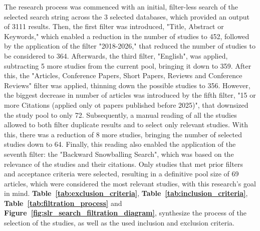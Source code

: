 \documentclass[12pt,reqno, twoside]{amsbook}
\theoremstyle{plain}
\numberwithin{equation}{chapter}
\newcommand{\tabref}[1]{\textbf{Table~\ref{#1}}}
\newcommand{\figref}[1]{\textbf{Figure~\ref{#1}}}
\numberwithin{section}{chapter}
\begin{document}
\noindent The research process was commenced with an initial, filter-less search of the selected search string across the 3 selected databases, which provided an output of 3111 results. Then, the first filter was introduced, "Title, Abstract or Keywords," which enabled a reduction in the number of studies to 452, followed by the 
application of the filter "2018-2026," that reduced the number of studies to be considered to 364. Afterwards, the third filter, "English", was applied, subtracting 5 more studies from the current pool, bringing it down to 359. After this, the "Articles, Conference Papers, Short Papers, Reviews and Conference Reviews" filter was applied, thinning down the possible studies to 356. However, the biggest decrease in number of articles was introduced by the fifth filter, "15 or more Citations (applied only ot papers published before 2025)", that downsized the study pool to only 72. Subsequently, a manual reading of all the studies allowed to both filter duplicate results and to select only relevant studies. With this, there was a reduction of 8 more studies, bringing the number of selected studies down to 64. Finally, this reading also enabled the application of the seventh filter: the "Backward Snowballing Search", which was based on the relevance of the studies and their citations. Only studies that met prior filters and acceptance criteria were selected, resulting in a definitive pool size of 69 articles, which were considered the most relevant studies, with this research's goal in mind.
\tabref{tab:exclusion_criteria}, \tabref{tab:inclusion_criteria}, \tabref{tab:filtration_process} and \figref{fig:slr_search_filtration_diagram}, synthesize the process of the selection of the studies, as well as the used inclusion and exclusion criteria.

\begin{table}[htbp]
    \centering
    \caption{Exclusion Criteria}
    \label{tab:exclusion_criteria}
\end{table}
\end{document}

